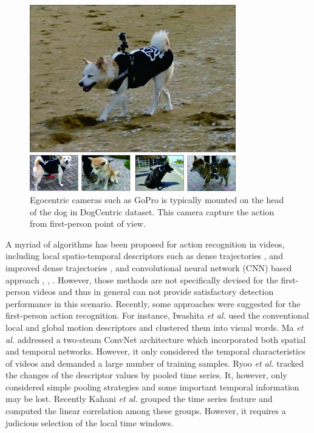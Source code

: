 \begin{figure}[!t]
	\centering
	\includegraphics[width=0.8\textwidth]{figures/dogcentric}
	\caption{Egocentric cameras such as GoPro is typically mounted on the head of the dog in DogCentric dataset. This camera capture the action from first-person point of view. 
	} 
	\label{fig:dogcentric}
\end{figure}

A myriad of algorithms has been proposed  for action recognition in
videos, including local spatio-temporal  descriptors such as dense
trajectories \cite{wang2013dense}, \cite{wang2011action} and improved dense trajectories \cite{wang2013action}, and convolutional neural network
(CNN) based approach \cite{wang2015action}, \cite{simonyan2014two}, \cite{wang2015temporal}. However, those methods are not specifically
devised for  the first-person videos and thus in general can not provide
satisfactory detection performance in this scenario. Recently, some
approaches were suggested for the first-person action recognition. For
instance, Iwashita \textit{et al.} \cite{iwashita2014first} used the
conventional local and global motion descriptors and clustered them
into visual words. Ma \textit{et al.} \cite{ma2016going} addressed a
two-steam ConvNet architecture which incorporated both spatial and
temporal networks. However, it only considered the temporal
characteristics of videos and demanded a large number of training
samples. Ryoo \textit{et al.} \cite{ryoo2015pooled} tracked the
changes of the descriptor values by pooled time series. It,
however, only considered simple pooling strategies and some
important temporal information may be lost. Recently
Kahani \textit{et al.} \cite{kahani2016time} grouped the time series
feature and computed the linear correlation among these groups.
However, it requires a judicious  selection of the local time
windows.

